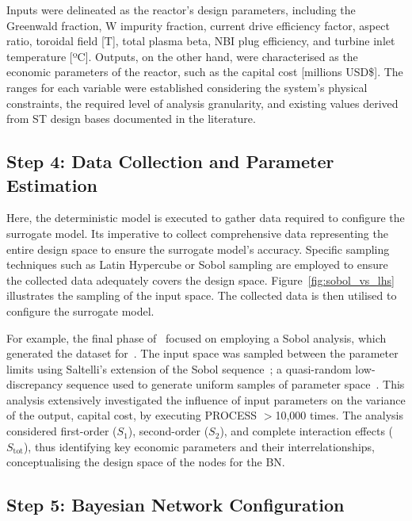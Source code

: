 \documentclass[journal]{IEEEtran}
\begin{document}
Inputs were delineated as the reactor's design parameters, including the Greenwald fraction, W impurity fraction, current drive efficiency factor, aspect ratio, toroidal field [T], total plasma beta, NBI plug efficiency, and turbine inlet temperature [ºC]. Outputs, on the other hand, were characterised as the economic parameters of the reactor, such as the capital cost [millions USD\$]. The ranges for each variable were established considering the system's physical constraints, the required level of analysis granularity, and existing values derived from ST design bases documented in the literature.

\subsection{\textbf{Step 4}: Data Collection and Parameter Estimation}\label{sec:data} 

Here, the deterministic model is executed to gather data required to configure the surrogate model. Its imperative to collect comprehensive data representing the entire design space to ensure the surrogate model's accuracy. Specific sampling techniques such as Latin Hypercube or Sobol sampling are employed to ensure the collected data adequately covers the design space. Figure~\ref{fig:sobol_vs_lhs} illustrates the sampling of the input space. The collected data is then utilised to configure the surrogate model. 

For example, the final phase of~\cite{Hidalgo-Salaverri2023} focused on employing a Sobol analysis, which generated the dataset for~\cite{Griffiths2024}. The input space was sampled between the parameter limits using Saltelli's extension of the Sobol sequence~\cite{Sobol2001, Saltelli2002}; a quasi-random low-discrepancy sequence used to generate uniform samples of parameter space~\cite{Herman2023}. This analysis extensively investigated the influence of input parameters on the variance of the output, capital cost, by executing PROCESS $>$10,000 times. The analysis considered first-order ($S_{1}$), second-order ($S_{2}$), and complete interaction effects ($S_{\text{tot}}$), thus identifying key economic parameters and their interrelationships, conceptualising the design space of the nodes for the BN.\@

\subsection{\textbf{Step 5}: Bayesian Network Configuration}\label{sec:BNconfiguration}
\end{document}
